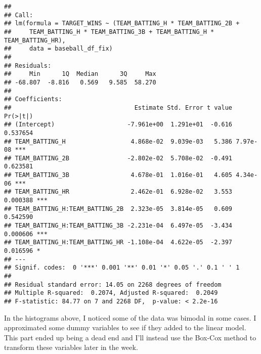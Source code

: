 \documentclass[
]{article}
\begin{document}
\begin{verbatim}
## 
## Call:
## lm(formula = TARGET_WINS ~ (TEAM_BATTING_H * TEAM_BATTING_2B + 
##     TEAM_BATTING_H * TEAM_BATTING_3B + TEAM_BATTING_H * TEAM_BATTING_HR), 
##     data = baseball_df_fix)
## 
## Residuals:
##     Min      1Q  Median      3Q     Max 
## -68.807  -8.816   0.569   9.585  58.270 
## 
## Coefficients:
##                                  Estimate Std. Error t value Pr(>|t|)    
## (Intercept)                    -7.961e+00  1.291e+01  -0.616 0.537654    
## TEAM_BATTING_H                  4.868e-02  9.039e-03   5.386 7.97e-08 ***
## TEAM_BATTING_2B                -2.802e-02  5.708e-02  -0.491 0.623581    
## TEAM_BATTING_3B                 4.678e-01  1.016e-01   4.605 4.34e-06 ***
## TEAM_BATTING_HR                 2.462e-01  6.928e-02   3.553 0.000388 ***
## TEAM_BATTING_H:TEAM_BATTING_2B  2.323e-05  3.814e-05   0.609 0.542590    
## TEAM_BATTING_H:TEAM_BATTING_3B -2.231e-04  6.497e-05  -3.434 0.000606 ***
## TEAM_BATTING_H:TEAM_BATTING_HR -1.108e-04  4.622e-05  -2.397 0.016596 *  
## ---
## Signif. codes:  0 '***' 0.001 '**' 0.01 '*' 0.05 '.' 0.1 ' ' 1
## 
## Residual standard error: 14.05 on 2268 degrees of freedom
## Multiple R-squared:  0.2074, Adjusted R-squared:  0.2049 
## F-statistic: 84.77 on 7 and 2268 DF,  p-value: < 2.2e-16
\end{verbatim}

In the histograms above, I noticed some of the data was bimodal in some
cases. I approximated some dummy variables to see if they added to the
linear model. This part ended up being a dead end and I'll instead use
the Box-Cox method to transform these variables later in the week.
\end{document}
